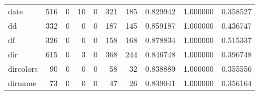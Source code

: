 \begin{tabular}{lrrrrrrrrr}
date      &                                   516 &                                                  0 &                                                 10 &                                                  0 &                                                321 &                                                185 &                                           0.829942 &                               1.000000 &                             0.358527 \\
dd        &                                   332 &                                                  0 &                                                  0 &                                                  0 &                                                187 &                                                145 &                                           0.859187 &                               1.000000 &                             0.436747 \\
df        &                                   326 &                                                  0 &                                                  0 &                                                  0 &                                                158 &                                                168 &                                           0.878834 &                               1.000000 &                             0.515337 \\
dir       &                                   615 &                                                  0 &                                                  3 &                                                  0 &                                                368 &                                                244 &                                           0.846748 &                               1.000000 &                             0.396748 \\
dircolors &                                    90 &                                                  0 &                                                  0 &                                                  0 &                                                 58 &                                                 32 &                                           0.838889 &                               1.000000 &                             0.355556 \\
dirname   &                                    73 &                                                  0 &                                                  0 &                                                  0 &                                                 47 &                                                 26 &                                           0.839041 &                               1.000000 &                             0.356164 \\

\end{tabular}
